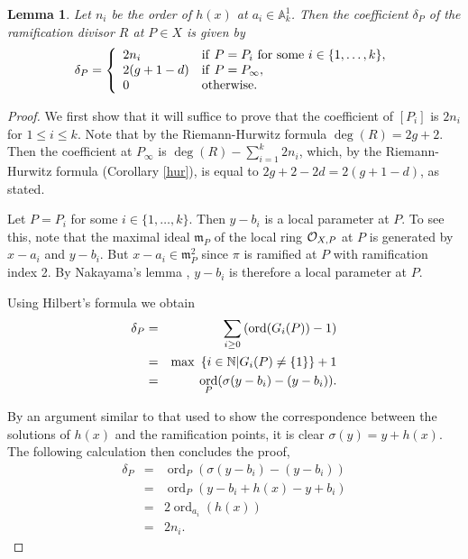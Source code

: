 \documentclass[11pt]{article} %
\theoremstyle{plain}
\newtheorem{lem}[defn]{Lemma}
\theoremstyle{remark}
\newcommand{\cO}{{\cal O}}
\newcommand{\NN}{{\mathbb N}}
\DeclareMathOperator{\ord}{ord}
\begin{document}
\begin{lem}\label{char2ramification}
 Let $n_i$ be the order of $h(x)$ at $a_i\in \mathbb A_k^1$.
Then the coefficient $\delta_P$ of the ramification divisor $R$ at $P\in X$ is given by
\[
 \delta_P = \left\{
 \begin{array}{ll}
 2n_i & {\rm if }\ P=P_i\ {\rm for\ some }\ i \in \{1,\ldots ,k\}, \\
 2(g+1-d) & {\rm if }\  P=P_\infty, \\
 0 & {\rm otherwise.} 
 \end{array}
\right.
\]
\end{lem}
\begin{proof}
 We first show that it will suffice to prove that the coefficient of $[P_i]$ is $2n_i$ for $1\leq i \leq k$.
 Note that by the Riemann-Hurwitz formula $\deg(R) = 2g+2$.
 Then the coefficient at $P_\infty$ is $\deg(R) - \sum_{i=1}^k2n_i$, which, by the Riemann-Hurwitz formula (Corollary \ref{hur}), is equal to $2g+2-2d = 2(g+1-d)$, as stated.
 
 Let $P=P_i$ for some $i\in \{1,\ldots , k\}$.
 Then $y-b_i$ is a local parameter at $P$.
 To see this, note that the maximal ideal $\mathfrak m_{P}$ of the local ring $\cO_{X,P}$ at $P$ is generated by $x-a_i$ and $y-b_i$.
 But $x-a_i\in \mathfrak m_{P}^2$ since $\pi$ is ramified at $P$ with ramification index 2.
 By Nakayama's lemma \cite[Prop. 2.6]{atiyahmacdonald}, $y-b_i$ is therefore a local parameter at $P$.
 
 Using Hilbert's formula \cite[Prop 4, \S 1, Ch IV]{localfields} we obtain
 \begin{eqnarray*}
  \delta_P & = & \sum_{i\geq 0} \left(\ord(G_i(P))-1\right) \\
  & = & {\rm max\ }\left\{ i\in \NN | G_i(P)\neq \{1\}\right\} + 1 \\
  & = & \ord_{P}(\sigma(y-b_i) - (y-b_i)).
  \end{eqnarray*}
  
 By an argument similar to that used to show the correspondence between the solutions of $h(x)$ and the ramification points, it is clear $\sigma(y)=y+h(x)$.
 The following calculation then concludes the proof,
  \begin{eqnarray*}
  \delta_P & = & \ord_{P}(\sigma(y-b_i) - (y-b_i)) \\
  & = & \ord_{P}(y-b_i+h(x) - y + b_i) \\
  & = & 2\ord_{a_i}(h(x)) \\
  & = & 2n_i.
 \end{eqnarray*}
\end{proof}
\end{document}
